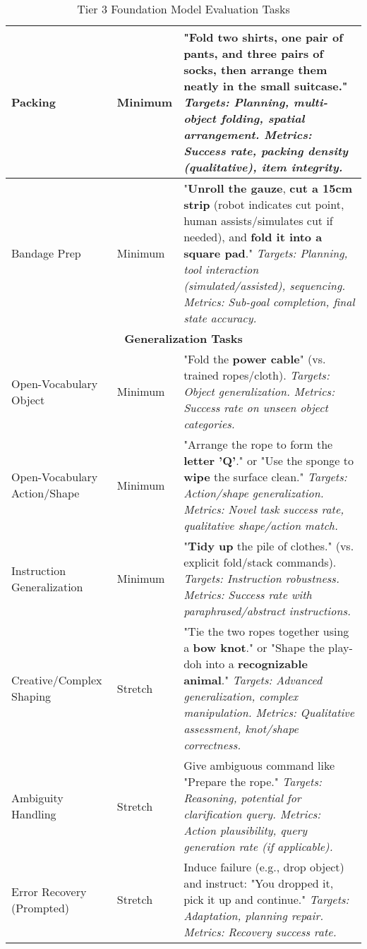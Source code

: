 \begin{table}[h]
\begin{tabular}{|p{3.5cm}|p{2cm}|p{8.5cm}|}
\hline
Packing & Minimum & "\textbf{Fold two shirts, one pair of pants, and three pairs of socks}, then \textbf{arrange them neatly} in the small suitcase." \textit{Targets: Planning, multi-object folding, spatial arrangement. Metrics: Success rate, packing density (qualitative), item integrity.} \\
\hline
Bandage Prep & Minimum & "\textbf{Unroll the gauze}, \textbf{cut a 15cm strip} (robot indicates cut point, human assists/simulates cut if needed), and \textbf{fold it into a square pad}." \textit{Targets: Planning, tool interaction (simulated/assisted), sequencing. Metrics: Sub-goal completion, final state accuracy.} \\
\hline
\multicolumn{3}{|c|}{\textbf{Generalization Tasks}} \\
\hline
Open-Vocabulary Object & Minimum & "Fold the \textbf{power cable}" (vs. trained ropes/cloth). \textit{Targets: Object generalization. Metrics: Success rate on unseen object categories.} \\
\hline
Open-Vocabulary Action/Shape & Minimum & "Arrange the rope to form the \textbf{letter 'Q'}." or "Use the sponge to \textbf{wipe} the surface clean." \textit{Targets: Action/shape generalization. Metrics: Novel task success rate, qualitative shape/action match.} \\
\hline
Instruction Generalization & Minimum & "\textbf{Tidy up} the pile of clothes." (vs. explicit fold/stack commands). \textit{Targets: Instruction robustness. Metrics: Success rate with paraphrased/abstract instructions.} \\
\hline
Creative/Complex Shaping & Stretch & "Tie the two ropes together using a \textbf{bow knot}." or "Shape the play-doh into a \textbf{recognizable animal}." \textit{Targets: Advanced generalization, complex manipulation. Metrics: Qualitative assessment, knot/shape correctness.} \\
\hline
Ambiguity Handling & Stretch & Give ambiguous command like "Prepare the rope." \textit{Targets: Reasoning, potential for clarification query. Metrics: Action plausibility, query generation rate (if applicable).} \\
\hline
Error Recovery (Prompted) & Stretch & Induce failure (e.g., drop object) and instruct: "You dropped it, pick it up and continue." \textit{Targets: Adaptation, planning repair. Metrics: Recovery success rate.} \\
\hline
\end{tabular}
\caption{Tier 3 Foundation Model Evaluation Tasks}
\end{table}